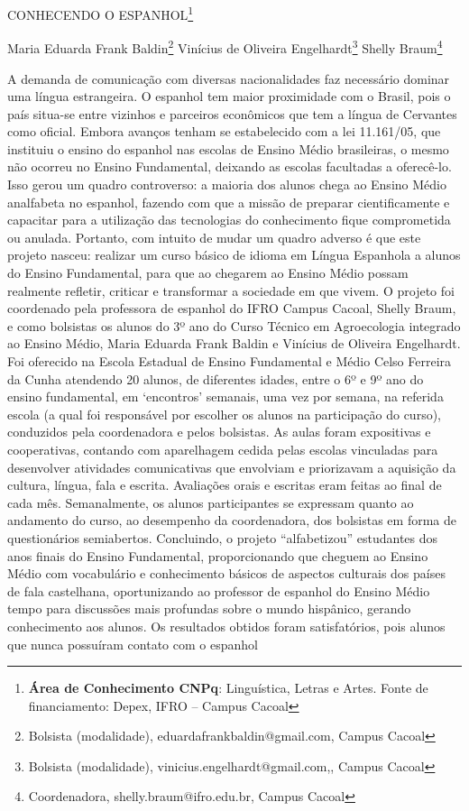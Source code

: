 \documentclass[article,12pt,onesidea,4paper,english,brazil]{abntex2}
\begin{document}
	
	
	\frenchspacing 
	
	\begin{center}
		\LARGE CONHECENDO O ESPANHOL\footnote{\textbf{Área de Conhecimento CNPq}: Linguística, Letras e Artes. Fonte de financiamento: Depex, IFRO – Campus Cacoal}
		
		\normalsize
		Maria Eduarda Frank Baldin\footnote{Bolsista (modalidade), eduardafrankbaldin@gmail.com, Campus Cacoal} 
		Vinícius de Oliveira Engelhardt\footnote{Bolsista (modalidade),  vinicius.engelhardt@gmail.com,, Campus Cacoal} 
		Shelly Braum\footnote{Coordenadora, shelly.braum@ifro.edu.br, Campus Cacoal} 
	\end{center}
	
	\noindent A demanda de comunicação com diversas nacionalidades faz necessário dominar uma língua estrangeira. O espanhol tem maior proximidade com o Brasil, pois o país situa-se entre vizinhos e parceiros econômicos que tem a língua de Cervantes como oficial. Embora avanços tenham se estabelecido com a lei 11.161/05, que instituiu o ensino do espanhol nas escolas de Ensino Médio brasileiras, o mesmo não ocorreu no Ensino Fundamental, deixando as escolas facultadas a oferecê-lo. Isso gerou um quadro controverso: a maioria dos alunos chega ao Ensino Médio analfabeta no espanhol, fazendo com que a missão de preparar cientificamente e capacitar para a utilização das tecnologias do conhecimento fique comprometida ou anulada. Portanto, com intuito de mudar um quadro adverso é que este projeto nasceu: realizar um curso básico de idioma em Língua Espanhola a alunos do Ensino Fundamental, para que ao chegarem ao Ensino Médio possam realmente refletir, criticar e transformar a sociedade em que vivem. O projeto foi coordenado pela professora de espanhol do IFRO Campus Cacoal, Shelly Braum, e como bolsistas os alunos do 3º ano do Curso Técnico em Agroecologia integrado ao Ensino Médio, Maria Eduarda Frank Baldin e Vinícius de Oliveira Engelhardt. Foi oferecido na Escola Estadual de Ensino Fundamental e Médio Celso Ferreira da Cunha atendendo 20 alunos, de diferentes idades, entre o 6º e 9º ano do ensino fundamental, em ‘encontros’ semanais, uma vez por semana, na referida escola (a qual foi responsável por escolher os alunos na participação do curso), conduzidos pela coordenadora e pelos bolsistas. As aulas foram expositivas e cooperativas, contando com aparelhagem cedida pelas escolas vinculadas para desenvolver atividades comunicativas que envolviam e priorizavam a aquisição da cultura, língua, fala e escrita. Avaliações orais e escritas eram feitas ao final de cada mês. Semanalmente, os alunos participantes se expressam quanto ao andamento do curso, ao desempenho da coordenadora, dos bolsistas em forma de questionários semiabertos. Concluindo, o projeto “alfabetizou” estudantes dos anos finais do Ensino Fundamental, proporcionando que cheguem ao Ensino Médio com vocabulário e conhecimento básicos de aspectos culturais dos países de fala castelhana, oportunizando ao professor de espanhol do Ensino Médio tempo para discussões mais profundas sobre o mundo hispânico, gerando conhecimento aos alunos. Os resultados obtidos foram satisfatórios, pois alunos que nunca possuíram contato com o espanhol 
\end{document}
